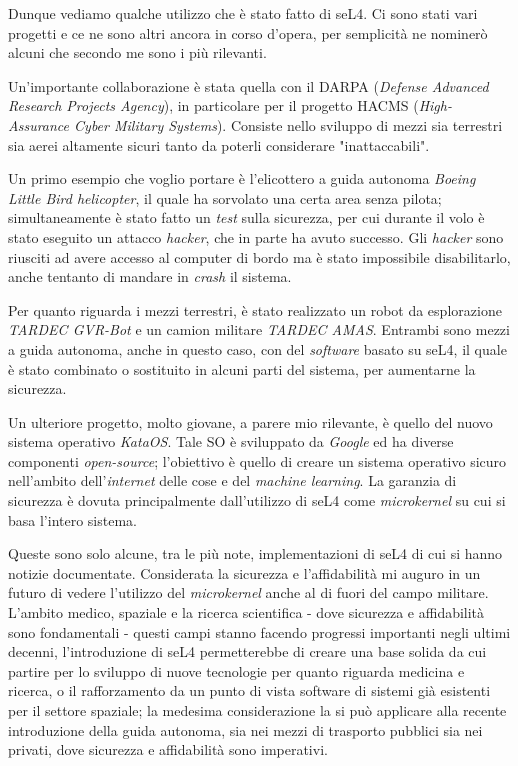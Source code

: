 Dunque vediamo qualche utilizzo che è stato fatto di seL4. Ci sono stati vari progetti e ce ne sono altri ancora in corso d'opera, per semplicità ne nominerò alcuni che secondo me sono i più rilevanti. 

Un'importante collaborazione è stata quella con il DARPA (\textit{Defense Advanced Research Projects Agency}), in particolare per il progetto HACMS (\textit{High-Assurance Cyber Military Systems}). Consiste nello sviluppo di mezzi sia terrestri sia aerei altamente sicuri tanto da poterli considerare "inattaccabili".

Un primo esempio che voglio portare è l'elicottero a guida autonoma \textit{Boeing Little Bird helicopter}, il quale ha sorvolato una certa area senza pilota; simultaneamente è stato fatto un \textit{test} sulla sicurezza, per cui durante il volo è stato eseguito un attacco \textit{hacker}, che in parte ha avuto successo. Gli \textit{hacker} sono riusciti ad avere accesso al computer di bordo ma è stato impossibile disabilitarlo, anche tentanto di mandare in \textit{crash} il sistema.

Per quanto riguarda i mezzi terrestri, è stato realizzato un robot da esplorazione \textit{TARDEC GVR-Bot} e un camion militare \textit{TARDEC AMAS}. Entrambi sono mezzi a guida autonoma, anche in questo caso, con del \textit{software} basato su seL4, il quale è stato combinato o sostituito in alcuni parti del sistema, per aumentarne la sicurezza.

Un ulteriore progetto, molto giovane, a parere mio rilevante, è quello del nuovo sistema operativo \textit{KataOS}. Tale SO è sviluppato da \textit{Google} ed ha diverse componenti \textit{open-source}; l'obiettivo è quello di creare un sistema operativo sicuro nell'ambito dell'\textit{internet} delle cose e del \textit{machine learning}. La garanzia di sicurezza è dovuta principalmente dall'utilizzo di seL4 come \textit{microkernel} su cui si basa l'intero sistema.

Queste sono solo alcune, tra le più note, implementazioni di seL4 di cui si hanno notizie documentate. Considerata la sicurezza e l'affidabilità mi auguro in un futuro di vedere l'utilizzo del \textit{microkernel} anche al di fuori del campo militare. L'ambito medico, spaziale e la ricerca scientifica - dove sicurezza e affidabilità sono fondamentali - questi campi stanno facendo progressi importanti negli ultimi decenni, l'introduzione di seL4 permetterebbe di creare una base solida da cui partire per lo sviluppo di nuove tecnologie per quanto riguarda medicina e ricerca, o il rafforzamento da un punto di vista software di sistemi già esistenti per il settore spaziale; la medesima considerazione la si può applicare alla recente introduzione della guida autonoma, sia nei mezzi di trasporto pubblici sia nei privati, dove sicurezza e affidabilità sono imperativi.

